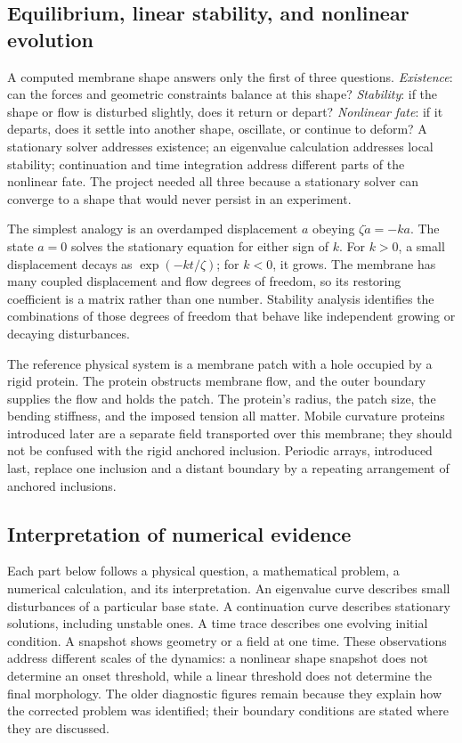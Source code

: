 \subsection{Equilibrium, linear stability, and nonlinear evolution}
A computed membrane shape answers only the first of three questions. \emph{Existence}: can the forces and geometric constraints balance at this shape? \emph{Stability}: if the shape or flow is disturbed slightly, does it return or depart? \emph{Nonlinear fate}: if it departs, does it settle into another shape, oscillate, or continue to deform? A stationary solver addresses existence; an eigenvalue calculation addresses local stability; continuation and time integration address different parts of the nonlinear fate. The project needed all three because a stationary solver can converge to a shape that would never persist in an experiment.

The simplest analogy is an overdamped displacement $a$ obeying $\zeta\dot a=-ka$. The state $a=0$ solves the stationary equation for either sign of $k$. For $k>0$, a small displacement decays as $\exp(-kt/\zeta)$; for $k<0$, it grows. The membrane has many coupled displacement and flow degrees of freedom, so its restoring coefficient is a matrix rather than one number. Stability analysis identifies the combinations of those degrees of freedom that behave like independent growing or decaying disturbances.

The reference physical system is a membrane patch with a hole occupied by a rigid protein. The protein obstructs membrane flow, and the outer boundary supplies the flow and holds the patch. The protein's radius, the patch size, the bending stiffness, and the imposed tension all matter. Mobile curvature proteins introduced later are a separate field transported over this membrane; they should not be confused with the rigid anchored inclusion. Periodic arrays, introduced last, replace one inclusion and a distant boundary by a repeating arrangement of anchored inclusions.

\subsection{Interpretation of numerical evidence}
Each part below follows a physical question, a mathematical problem, a numerical calculation, and its interpretation. An eigenvalue curve describes small disturbances of a particular base state. A continuation curve describes stationary solutions, including unstable ones. A time trace describes one evolving initial condition. A snapshot shows geometry or a field at one time. These observations address different scales of the dynamics: a nonlinear shape snapshot does not determine an onset threshold, while a linear threshold does not determine the final morphology. The older diagnostic figures remain because they explain how the corrected problem was identified; their boundary conditions are stated where they are discussed.


